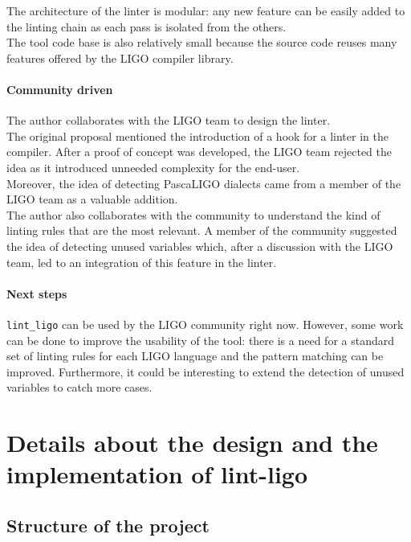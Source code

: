 \documentclass[10pt,a4paper]{article}
\begin{document}
The architecture of the linter is modular: any new feature can be easily added to the linting chain as each pass is isolated from the others.\\
The tool code base is also relatively small because the source code reuses many features offered by the LIGO compiler library.

\paragraph{Community driven}
The author collaborates with the LIGO team to design the linter.\\
The original proposal mentioned the introduction of a hook for a linter in the compiler. After a proof of concept was developed, the LIGO team rejected the idea as it introduced unneeded complexity for the end-user.\\
Moreover, the idea of detecting PascaLIGO dialects came from a member of the LIGO team as a valuable addition.\\

The author also collaborates with the community to understand the kind of linting rules that are the most relevant. A member of the community suggested the idea of detecting unused variables which, after a discussion with the LIGO team, led to an integration of this feature in the linter.

\paragraph{Next steps}

\verb|lint_ligo| can be used by the LIGO community right now.
However, some work can be done to improve the usability of the tool: there is a need for a standard set of linting rules for each LIGO language and the pattern matching can be improved.
Furthermore, it could be interesting to extend the detection of unused variables to catch more cases.

\section{Details about the design and the implementation of lint-ligo}

\subsection{Structure of the project}
\end{document}
